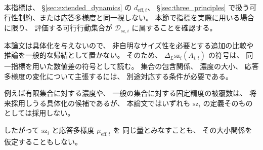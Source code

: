 本指標は、
\S\ref{sec:extended_dynamics} の $d_{\mathrm{eff},t}$、
\S\ref{sec:three_principles} で扱う可行性制約、または応答多様度と同一視しない。
本節で指標を実際に用いる場合に限り、
評価する可行行動集合が
$\mathcal D_{\mathrm{sz},i}$ に属することを確認する。

本論文は具体化を与えないので、
非自明なサイズ性を必要とする追加の比較や推論を一般的な帰結として置かない。
そのため、
$\Delta_L\mathrm{sz}_i(A_{i,t})$ の符号は、
同一指標を用いた数値差の符号として読む。
集合の包含関係、
濃度の大小、
応答多様度の変化について主張するには、
別途対応する条件が必要である。

例えば有限集合に対する濃度や、
一般の集合に対する固定精度の被覆数は、
将来採用しうる具体化の候補であるが、
本論文ではいずれも
$\mathrm{sz}_i$ の定義そのものとしては採用しない。

したがって $\mathrm{sz}_i$ と応答多様度 $\mu_{\mathrm{eff},t}$ を
同じ量とみなすことも、
その大小関係を仮定することもしない。


